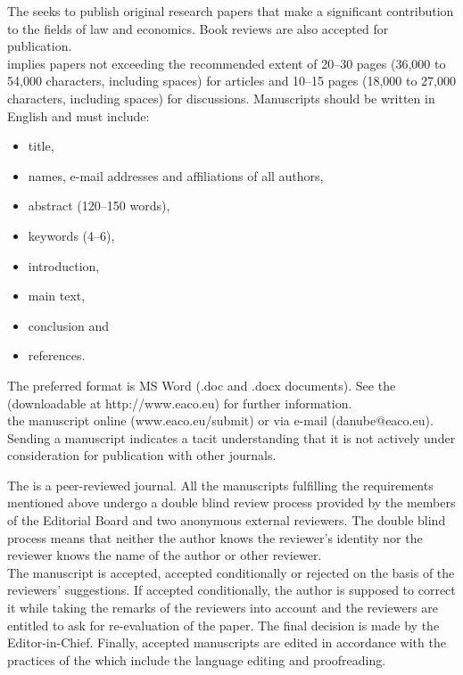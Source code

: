 \newpage
\pagestyle{guidelines}

The  seeks to publish original research papers that make a significant contribution to the fields of law and economics. Book reviews are also accepted for publication.\\[4mm]
 implies papers not exceeding the recommended extent of 20--30 pages (36,000 to 54,000 characters, including spaces) for articles and 10--15 pages (18,000 to 27,000 characters, including spaces) for discussions. Manuscripts should be written in English and must include:
\begin{itemize}
\setlength{\leftskip}{-3mm}
\item[\sq{wi.png}{2ex}] title,
\item[\sq{wi.png}{2ex}] names, e-mail addresses and affiliations of all authors,
\item[\sq{wi.png}{2ex}] abstract (120--150 words),
\item[\sq{wi.png}{2ex}] keywords (4--6),
\item[\sq{wi.png}{2ex}] introduction,
\item[\sq{wi.png}{2ex}] main text,
\item[\sq{wi.png}{2ex}] conclusion and
\item[\sq{wi.png}{2ex}] references.
\end{itemize}
\vspace*{4mm}
The preferred format is MS Word (.doc and .docx documents). See the  (downloadable at http://www.eaco.eu) for further information.\\[4mm]
 the manuscript online (www.eaco.eu/submit) or via e-mail (danube@eaco.eu). Sending a manuscript indicates a tacit understanding that it is not actively under consideration for publication with other journals.\\[4mm]

The  is a peer-reviewed journal. All the manuscripts fulfilling the requirements mentioned above undergo a double blind review process provided by the members of the Editorial Board and two anonymous external reviewers. The double blind process means that neither the author knows the reviewer's identity nor the reviewer knows the name of the author or other reviewer.\\[4mm]
The manuscript is accepted, accepted conditionally or rejected on the basis of the reviewers' suggestions. If accepted conditionally, the author is supposed to correct it while taking the remarks of the reviewers into account and the reviewers are entitled to ask for re-evaluation of the paper. The final decision is made by the Editor-in-Chief. Finally, accepted manuscripts are edited in accordance with the practices of the  which include the language editing and proofreading.

